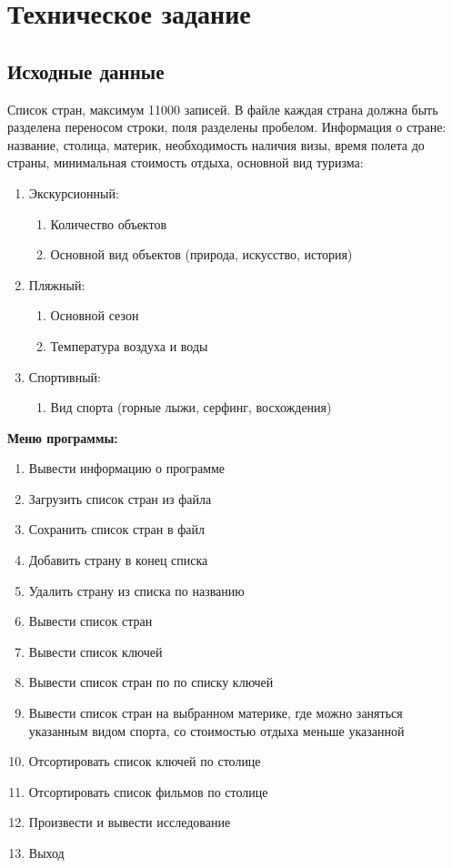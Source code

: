 \section{Техническое задание}
\subsection{Исходные данные}
	Список стран, максимум 11000 записей. В файле каждая страна должна быть разделена переносом строки, поля разделены пробелом. Информация о стране: название, столица, материк, необходимость наличия визы, время полета до страны, минимальная стоимость отдыха, основной вид туризма:
	\begin{enumerate}
		\item Экскурсионный: 
		\begin{enumerate}
			\item Количество объектов
			\item Основной вид объектов (природа, искусство, история)
		\end{enumerate}
		\item Пляжный:
		\begin{enumerate}
			\item Основной сезон
			\item Температура воздуха и воды
		\end{enumerate}
		\item Спортивный:
		\begin{enumerate}
			\item Вид спорта (горные лыжи, серфинг, восхождения)
		\end{enumerate}
	\end{enumerate}

\noindent\textbf{Меню программы:}
\begin{enumerate}
	\item Вывести информацию о программе
	\item Загрузить список стран из файла
	\item Сохранить список стран в файл
	\item Добавить страну в конец списка
	\item Удалить страну из списка по названию
	\item Вывести список стран
	\item Вывести список ключей
	\item Вывести список стран по по списку ключей
	\item Вывести список стран на выбранном материке, где можно заняться указанным видом спорта, со стоимостью отдыха меньше указанной
	\item Отсортировать список ключей по столице
	\item Отсортировать список фильмов по столице
	\item Произвести и вывести исследование
	\item Выход
\end{enumerate}


